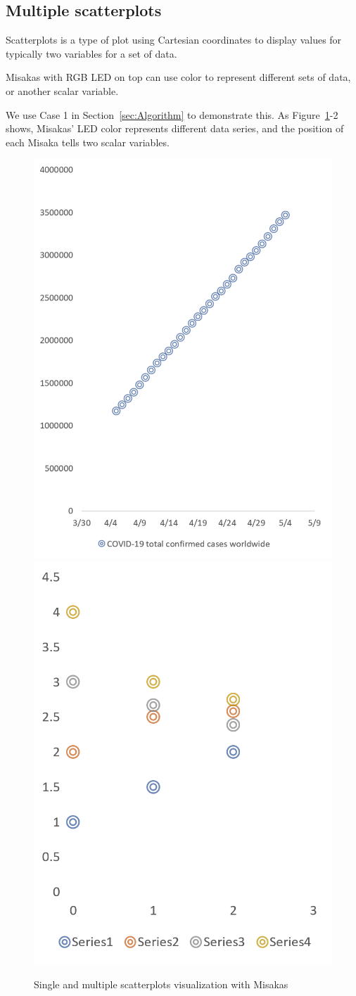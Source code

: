 \documentclass[conference]{IEEEtran}
\begin{document}
\subsection{Multiple scatterplots}

Scatterplots is a type of plot using Cartesian coordinates to display values for typically two variables for a set of data. 




Misakas with RGB LED on top can use color to represent different sets of data, or another scalar variable.

We use Case 1 in Section~\ref{sec:Algorithm} to demonstrate this. As Figure~\ref{fig:scatterplots1}-2 shows, Misakas’ LED color represents different data series, and the position of each Misaka tells two scalar variables. 

\begin{figure}[htbp]
    \centering
    \includegraphics[width=0.49\columnwidth]{scatterplots02.png}
    \includegraphics[width=0.49\columnwidth]{scatterplots01.png}
    \caption{Single and multiple scatterplots visualization with Misakas}
    \label{fig:scatterplots1}
\end{figure}
\end{document}

